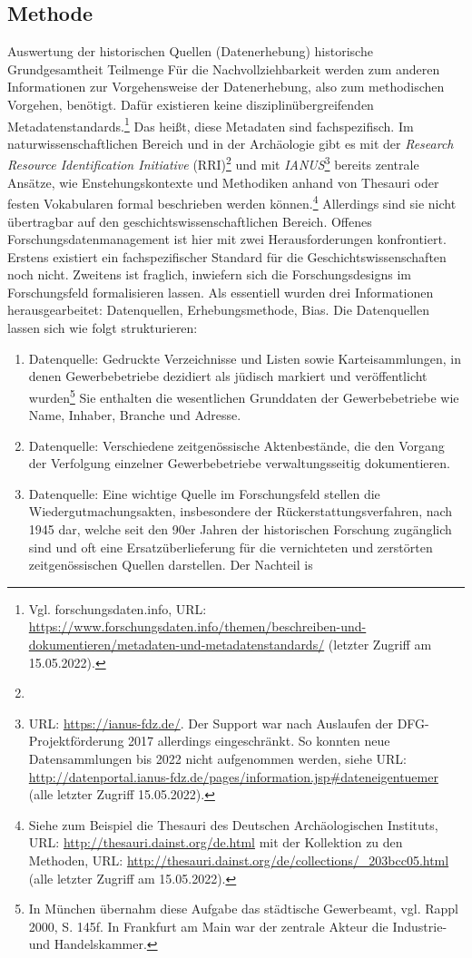 \subsection{Methode}
Auswertung der historischen Quellen (Datenerhebung)
historische Grundgesamtheit Teilmenge
Für die Nachvollziehbarkeit werden zum anderen Informationen zur Vorgehensweise der Datenerhebung, also zum methodischen Vorgehen, benötigt. Dafür existieren keine disziplinübergreifenden Metadatenstandards.\footnote{Vgl. forschungsdaten.info, URL: \url{https://www.forschungsdaten.info/themen/beschreiben-und-dokumentieren/metadaten-und-metadatenstandards/} (letzter Zugriff am 15.05.2022).} Das heißt, diese Metadaten sind fachspezifisch. Im naturwissenschaftlichen Bereich und in der Archäologie gibt es mit der \textit{Research Resource Identification Initiative} (RRI)\footnote{} und mit \textit{IANUS}\footnote{URL: \url{https://ianus-fdz.de/}. Der Support war nach Auslaufen der DFG-Projektförderung 2017 allerdings eingeschränkt. So konnten neue Datensammlungen bis 2022 nicht aufgenommen werden, siehe URL: \url{http://datenportal.ianus-fdz.de/pages/information.jsp\#dateneigentuemer} (alle letzter Zugriff 15.05.2022).} bereits zentrale Ansätze, wie Enstehungskontexte und Methodiken anhand von Thesauri oder festen Vokabularen formal beschrieben werden können.\footnote{Siehe zum Beispiel die Thesauri des Deutschen Archäologischen Instituts, URL: \url{http://thesauri.dainst.org/de.html} mit der Kollektion zu den Methoden, URL: \url{http://thesauri.dainst.org/de/collections/\_203bcc05.html} (alle letzter Zugriff am 15.05.2022).} Allerdings sind sie nicht übertragbar auf den geschichtswissenschaftlichen Bereich. Offenes Forschungsdatenmanagement ist hier mit zwei Herausforderungen konfrontiert. Erstens existiert ein fachspezifischer Standard für die Geschichtswissenschaften noch nicht. Zweitens ist fraglich, inwiefern sich die Forschungsdesigns im Forschungsfeld formalisieren lassen. Als essentiell wurden drei Informationen herausgearbeitet: Datenquellen, Erhebungsmethode, Bias. Die Datenquellen lassen sich wie folgt strukturieren:

\begin{enumerate}
    \item Datenquelle: Gedruckte Verzeichnisse und Listen sowie Karteisammlungen, in denen Gewerbebetriebe dezidiert als jüdisch markiert und veröffentlicht wurden\footnote{In München übernahm diese Aufgabe das städtische Gewerbeamt, vgl. Rappl 2000, S. 145f. In Frankfurt am Main war der zentrale Akteur die Industrie- und Handelskammer.} Sie enthalten die wesentlichen Grunddaten der Gewerbebetriebe wie Name, Inhaber, Branche und Adresse.
    \item Datenquelle: Verschiedene zeitgenössische Aktenbestände, die den Vorgang der Verfolgung einzelner Gewerbebetriebe verwaltungsseitig dokumentieren. 
    \item Datenquelle: Eine wichtige Quelle im Forschungsfeld stellen die Wiedergutmachungsakten, insbesondere der Rückerstattungsverfahren, nach 1945 dar, welche seit den 90er Jahren der historischen Forschung zugänglich sind und oft eine Ersatzüberlieferung für die vernichteten und zerstörten zeitgenössischen Quellen darstellen. Der Nachteil is     
\end{enumerate}

